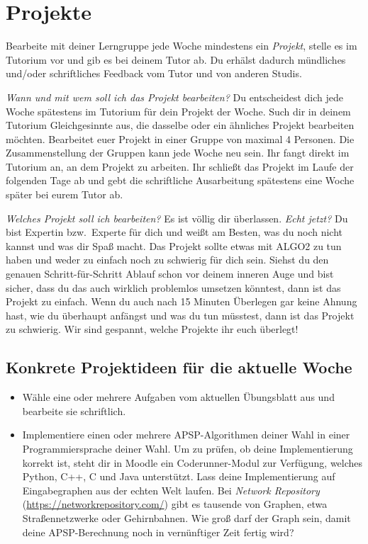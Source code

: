 \documentclass{uebung_cs}
\begin{document}
\newpage
\section*{\projekt{} Projekte}

Bearbeite mit deiner Lerngruppe jede Woche mindestens ein \emph{Projekt}, stelle es im Tutorium vor und gib es bei deinem Tutor ab.
Du erhälst dadurch mündliches und/oder schriftliches Feedback vom Tutor und von anderen Studis.

\emph{Wann und mit wem soll ich das Projekt bearbeiten?}
Du entscheidest dich jede Woche spätestens im Tutorium für dein Projekt der Woche.
Such dir in deinem Tutorium Gleichgesinnte aus, die dasselbe oder ein ähnliches Projekt bearbeiten möchten.
Bearbeitet euer Projekt in einer Gruppe von maximal 4 Personen.
Die Zusammenstellung der Gruppen kann jede Woche neu sein.
Ihr fangt direkt im Tutorium an, an dem Projekt zu arbeiten.
Ihr schließt das Projekt im Laufe der folgenden Tage ab und gebt die schriftliche Ausarbeitung spätestens eine Woche später bei eurem Tutor ab.

\emph{Welches Projekt soll ich bearbeiten?}
Es ist völlig dir überlassen.
\emph{Echt jetzt?}
Du bist Expertin bzw.\ Experte für dich und weißt am Besten, was du noch nicht kannst und was dir Spaß macht.
Das Projekt sollte etwas mit ALGO2 zu tun haben und weder zu einfach noch zu schwierig für dich sein. Siehst du den genauen Schritt-für-Schritt Ablauf schon vor deinem inneren Auge und bist sicher, dass du das auch wirklich problemlos umsetzen könntest, dann ist das Projekt zu einfach.
Wenn du auch nach 15 Minuten Überlegen gar keine Ahnung hast, wie du überhaupt anfängst und was du tun müsstest, dann ist das Projekt zu schwierig.
Wir sind gespannt, welche Projekte ihr euch überlegt!

\subsection*{Konkrete Projektideen für die aktuelle Woche}
\begin{itemize}
  \item
  Wähle eine oder mehrere Aufgaben vom aktuellen Übungsblatt aus und bearbeite sie schriftlich.
  \item
  Implementiere einen oder mehrere APSP-Algorithmen deiner Wahl in einer Programmiersprache deiner Wahl.
  Um zu prüfen, ob deine Implementierung korrekt ist, steht dir in Moodle ein Coderunner-Modul zur Verfügung, welches Python, C++, C und Java unterstützt.
  Lass deine Implementierung auf Eingabegraphen aus der echten Welt laufen.
  Bei \emph{Network Repository} (\url{https://networkrepository.com/}) gibt es tausende von Graphen, etwa Straßennetzwerke oder Gehirnbahnen.
  Wie groß darf der Graph sein, damit deine APSP-Berechnung noch in vernünftiger Zeit fertig wird?
\end{itemize}
\end{document}
